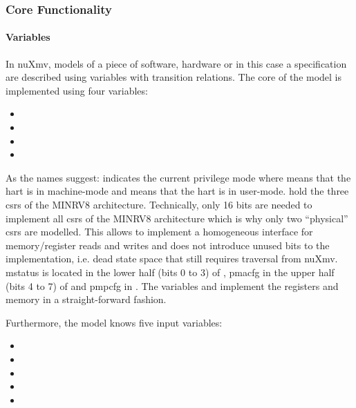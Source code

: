 
\subsubsection{Core Functionality}

\paragraph{Variables}
In nuXmv, models of a piece of software, hardware or in this case a specification are described using variables with transition relations.
The core of the model is implemented using four variables:
\begin{itemize}
    \item {}
    \item {}
    \item {}
    \item {}
\end{itemize}

As the names suggest:  indicates the current privilege mode where  means that the \gls{hart} is in machine-mode and  means that the \gls{hart} is in user-mode.
 hold the three \glspl{csr} of the MINRV8 architecture.
Technically, only 16 bits are needed to implement all \glspl{csr} of the MINRV8 architecture which is why only two \enquote{physical} \glspl{csr} are modelled.
This allows to implement a homogeneous interface for memory/register reads and writes and does not introduce unused bits to the implementation, i.e. dead state space that still requires traversal from nuXmv.
\gls{mstatus} is located in the lower half (bits 0 to 3) of , \gls{pmacfg} in the upper half (bits 4 to 7) of  and \gls{pmpcfg} in .
The variables  and  implement the registers and memory in a straight-forward fashion.

Furthermore, the model knows five input variables:
\begin{itemize}
    \item {}
    \item {}
    \item {}
    \item {}
    \item {}
\end{itemize}

